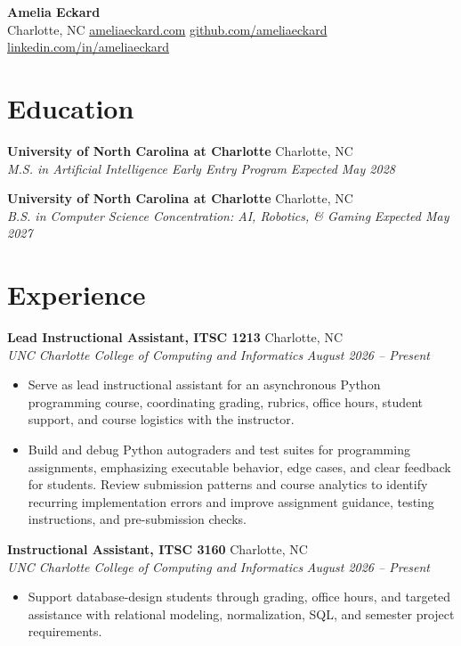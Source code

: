 \documentclass[letterpaper,10pt]{article}
\newcommand{\resumeentry}[4]{
  \noindent\textbf{#1} \hfill #2 \\
  \textit{#3} \hfill \textit{#4}
}
\begin{document}
\begin{center}
  {\Large\textbf{Amelia Eckard}} \\[3pt]
  Charlotte, NC \textbar{}
  \href{https://ameliaeckard.com}{ameliaeckard.com} \textbar{}
  \href{https://github.com/ameliaeckard}{github.com/ameliaeckard} \textbar{}
  \href{https://linkedin.com/in/ameliaeckard}{linkedin.com/in/ameliaeckard}
\end{center}

\section{Education}

\resumeentry
  {University of North Carolina at Charlotte}{Charlotte, NC}
  {M.S. in Artificial Intelligence \textbar{} Early Entry Program}{Expected May 2028}

\smallskip

\resumeentry
  {University of North Carolina at Charlotte}{Charlotte, NC}
  {B.S. in Computer Science \textbar{} Concentration: AI, Robotics, \& Gaming}{Expected May 2027}

\section{Experience}

\resumeentry
  {Lead Instructional Assistant, ITSC 1213}{Charlotte, NC}
  {UNC Charlotte College of Computing and Informatics}{August 2026 -- Present}
\begin{itemize}
  \item Serve as lead instructional assistant for an asynchronous Python programming course, coordinating grading, rubrics, office hours, student support, and course logistics with the instructor.
  \item Build and debug Python autograders and test suites for programming assignments, emphasizing executable behavior, edge cases, and clear feedback for students. Review submission patterns and course analytics to identify recurring implementation errors and improve assignment guidance, testing instructions, and pre-submission checks.
\end{itemize}

\smallskip

\resumeentry
  {Instructional Assistant, ITSC 3160}{Charlotte, NC}
  {UNC Charlotte College of Computing and Informatics}{August 2026 -- Present}
\begin{itemize}
  \item Support database-design students through grading, office hours, and targeted assistance with relational modeling, normalization, SQL, and semester project requirements.
\end{itemize}
\end{document}
